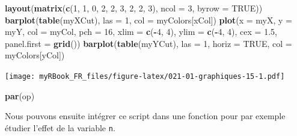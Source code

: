 \documentclass[]{book}
\newenvironment{Shaded}{\begin{snugshade}}{\end{snugshade}}
\newcommand{\DataTypeTok}[1]{\textcolor[rgb]{0.13,0.29,0.53}{#1}}
\newcommand{\DecValTok}[1]{\textcolor[rgb]{0.00,0.00,0.81}{#1}}
\newcommand{\FloatTok}[1]{\textcolor[rgb]{0.00,0.00,0.81}{#1}}
\newcommand{\KeywordTok}[1]{\textcolor[rgb]{0.13,0.29,0.53}{\textbf{#1}}}
\newcommand{\NormalTok}[1]{#1}
\newcommand{\OperatorTok}[1]{\textcolor[rgb]{0.81,0.36,0.00}{\textbf{#1}}}
\newcommand{\OtherTok}[1]{\textcolor[rgb]{0.56,0.35,0.01}{#1}}
\begin{document}
\begin{Shaded}
\begin{Highlighting}[]
\KeywordTok{layout}\NormalTok{(}\KeywordTok{matrix}\NormalTok{(}\KeywordTok{c}\NormalTok{(}\DecValTok{1}\NormalTok{, }\DecValTok{1}\NormalTok{, }\DecValTok{0}\NormalTok{, }
                \DecValTok{2}\NormalTok{, }\DecValTok{2}\NormalTok{, }\DecValTok{3}\NormalTok{, }
                \DecValTok{2}\NormalTok{, }\DecValTok{2}\NormalTok{, }\DecValTok{3}\NormalTok{), }\DataTypeTok{ncol =} \DecValTok{3}\NormalTok{, }\DataTypeTok{byrow =} \OtherTok{TRUE}\NormalTok{))}
\KeywordTok{barplot}\NormalTok{(}\KeywordTok{table}\NormalTok{(myXCut), }\DataTypeTok{las =} \DecValTok{1}\NormalTok{, }\DataTypeTok{col =}\NormalTok{ myColors[xCol])}
\KeywordTok{plot}\NormalTok{(}\DataTypeTok{x =}\NormalTok{ myX, }\DataTypeTok{y =}\NormalTok{ myY, }\DataTypeTok{col =}\NormalTok{ myCol, }\DataTypeTok{pch =} \DecValTok{16}\NormalTok{, }
  \DataTypeTok{xlim =} \KeywordTok{c}\NormalTok{(}\OperatorTok{-}\DecValTok{4}\NormalTok{, }\DecValTok{4}\NormalTok{), }\DataTypeTok{ylim =} \KeywordTok{c}\NormalTok{(}\OperatorTok{-}\DecValTok{4}\NormalTok{, }\DecValTok{4}\NormalTok{), }\DataTypeTok{cex =} \FloatTok{1.5}\NormalTok{, }
  \DataTypeTok{panel.first =} \KeywordTok{grid}\NormalTok{())}
\KeywordTok{barplot}\NormalTok{(}\KeywordTok{table}\NormalTok{(myYCut), }\DataTypeTok{las =} \DecValTok{1}\NormalTok{, }\DataTypeTok{horiz =} \OtherTok{TRUE}\NormalTok{, }\DataTypeTok{col =}\NormalTok{ myColors[yCol])}
\end{Highlighting}
\end{Shaded}

\texttt{[image: myRBook\_FR\_files/figure-latex/021-01-graphiques-15-1.pdf]}

\begin{Shaded}
\begin{Highlighting}[]
\KeywordTok{par}\NormalTok{(op)}
\end{Highlighting}
\end{Shaded}

Nous pouvons ensuite intégrer ce script dans une fonction pour par exemple étudier l'effet de la variable \texttt{n}.
\end{document}

